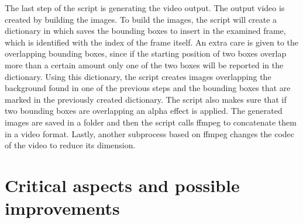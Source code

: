 \documentclass[conference]{IEEEtran}
\begin{document}
\begin{itemize}
				The last step of the script is generating the video output. 
				The output video is created by building the images. To build the images, the script will create a dictionary in which saves the bounding boxes to 
				insert in the examined frame, which is identified with the index of the frame itself. An extra care is given to the overlapping bounding boxes, since 
				if the starting position of two boxes overlap more than a certain amount only one of the two boxes will be reported in the dictionary. 
				Using this dictionary, the script creates images overlapping the background found in one of the previous steps and the bounding boxes that are marked 
				in the previously created dictionary. The script also makes sure that if two bounding boxes are overlapping an alpha effect is applied. The generated images 
				are saved in a folder and then the script calls ffmpeg to concatenate them in a video format. Lastly, another subprocess based on ffmpeg changes the codec 
				of the video to reduce its dimension.
			
		\end{itemize}

	\section{Critical aspects and possible improvements}
	
\end{document}
